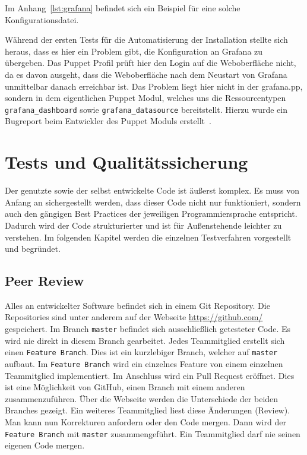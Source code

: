 Im Anhang~\ref{lst:grafana} befindet sich ein Beispiel für eine solche
Konfigurationsdatei.

Während der ersten Tests für die Automatisierung der Installation stellte sich
heraus, dass es hier ein Problem gibt, die Konfiguration an Grafana zu
übergeben. Das Puppet Profil prüft hier den Login auf die Weboberfläche nicht,
da es davon ausgeht, dass die Weboberfläche nach dem Neustart von Grafana
unmittelbar danach erreichbar ist. Das Problem liegt hier nicht in der
grafana.pp, sondern in dem eigentlichen Puppet Modul, welches uns die
Ressourcentypen \texttt{grafana\_dashboard} sowie \texttt{grafana\_datasource}
bereitstellt.  Hierzu wurde ein Bugreport beim Entwickler des Puppet Moduls
erstellt~\cite{grafana-issue}.
\mr%

\chapter{Tests und Qualitätssicherung}
Der genutzte sowie der selbst entwickelte Code ist äußerst komplex. Es
muss von Anfang an sichergestellt werden, dass dieser Code nicht nur
funktioniert, sondern auch den gängigen Best Practices der jeweiligen
Programmiersprache entspricht. Dadurch wird der Code strukturierter und
ist für Außenstehende leichter zu verstehen. Im folgenden Kapitel werden die
einzelnen Testverfahren vorgestellt und begründet.
\tm%

\section{Peer Review}
Alles an entwickelter Software befindet sich in einem \gls{Git}
\gls{Repository}. Die Repositories sind unter anderem auf der Webseite
\url{https://github.com/} gespeichert. Im Branch \texttt{master} befindet sich
ausschließlich getesteter Code. Es wird nie direkt in diesem Branch gearbeitet.
Jedes Teammitglied erstellt sich einen \texttt{Feature Branch}. Dies ist ein
kurzlebiger Branch, welcher auf \texttt{master} aufbaut. Im \texttt{Feature
Branch} wird ein einzelnes Feature von einem einzelnen Teammitglied
implementiert. Im Anschluss wird ein Pull Request eröffnet. Dies ist eine
Möglichkeit von GitHub, einen Branch mit einem anderen zusammenzuführen. Über
die Webseite werden die Unterschiede der beiden Branches gezeigt. Ein weiteres
Teammitglied liest diese Änderungen (Review). Man kann nun Korrekturen
anfordern oder den Code mergen. Dann wird der \texttt{Feature Branch} mit
\texttt{master} zusammengeführt. Ein Teammitglied darf nie seinen eigenen Code
mergen.
\tm%


